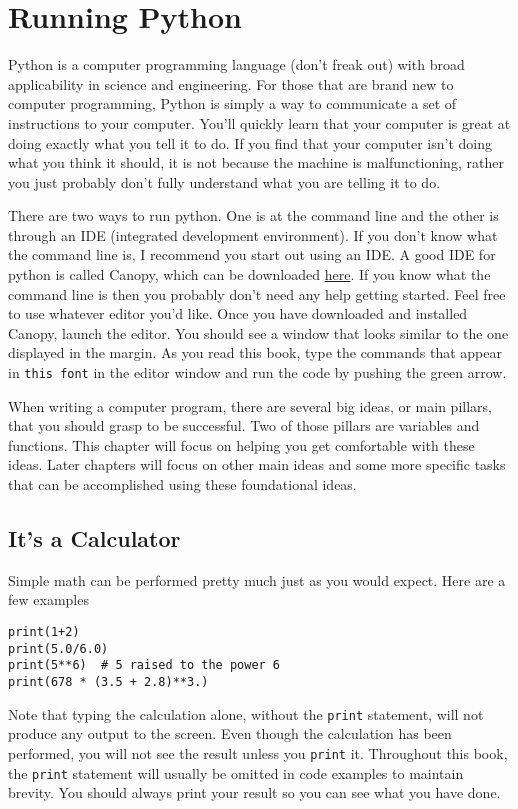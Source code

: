 \chapter{Running Python}
\label{chap:RunningPython}


Python is a computer programming language (don't freak out) with broad
applicability in science and engineering.  For those that are brand
new to computer programming, Python is simply a way to communicate a
set of instructions to your computer.  You'll quickly learn that your
computer is great at doing exactly what you tell it to do.  If you
find that your computer isn't doing what you think it should, it is
not because the machine is malfunctioning, rather you just probably
don't fully understand what you are telling it to do.

There are two ways to run python. One is at the command line and the
other is through an IDE (integrated development environment). If you
don't know what the command line is, I recommend you start out using
an IDE. A good IDE for python is called Canopy, which can
be downloaded \href{https://store.enthought.com/downloads/}{here}. If
you know what the command line is then you probably don't need any
help getting started. Feel free to use whatever editor you'd
like. Once you have downloaded and installed Canopy, launch the
editor. You should see a window that looks similar to the one
displayed in the margin. As you read this book, type the commands that
appear in \texttt{this font} in the editor window and run the code by
pushing the green arrow.

When writing a computer program, there are several big ideas, or main
pillars, that you should grasp to be successful.  Two of those pillars
are variables and functions. This chapter will focus on helping you
get comfortable with these ideas.  Later chapters will focus on other
main ideas and some more specific tasks that can be accomplished using
these foundational ideas.
\section{It's a Calculator}
Simple math can be performed pretty much just as you would
expect. Here are a few examples
\begin{Verbatim}
print(1+2)
print(5.0/6.0)
print(5**6)  # 5 raised to the power 6
print(678 * (3.5 + 2.8)**3.)
\end{Verbatim}
Note that typing the calculation alone, without the \texttt{print}
statement, will not produce any output to the screen.  Even though the
calculation has been performed, you will not see the result unless you
\texttt{print} it. Throughout this book, the \texttt{print}
statement will usually be omitted in code examples to maintain
brevity.  You should always print your result so you can see what you
have done.

